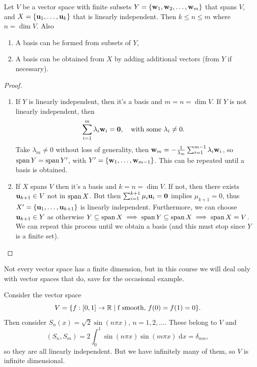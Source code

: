 \documentclass[a4paper]{scrartcl}
\begin{document}
\begin{proposition}
    Let $V$ be a vector space with finite subsets $Y = \{\mathbf{w}_1, \mathbf{w}_2, \dots, \mathbf{w}_m\}$ that spans $V$, and $X = \{\mathbf{u}_1, \dots, \mathbf{u}_k \}$ that is linearly independent. Then $k \leq n \leq m$ where $n = \operatorname{dim} V$. Also
    \begin{enumerate}[label=(\roman*)]
        \item A basis can be formed from subsets of $Y$,
        \item A basis can be obtained from $X$ by adding additional vectors (from $Y$ if necessary).
    \end{enumerate}
\end{proposition}
\begin{proof}
    \begin{enumerate}[label=(\roman*)]
        \item If $Y$ is linearly independent, then it's a basis and $m = n = \operatorname{dim} V$. If $Y$ is not linearly independent, then
        $$
        \sum_{i = 1}^m \lambda_i \mathbf{w}_i = \mathbf{0}, \quad \text{with some } \lambda_i \neq 0.
        $$
        Take $\lambda_m \neq 0$ without loss of generality, then $\mathbf{w}_m = -\frac{1}{\lambda_m} \sum_{i = 1}^{m - 1} \lambda_i \mathbf{w}_i$,
        so $\operatorname{span} Y = \operatorname{span} Y'$, with $Y' = \{\mathbf{w}_1, \dots, \mathbf{w}_{m - 1}\}$. This can be repeated until a basis is obtained.
        \item If $X$ spans $V$ then it's a basis and $k = n = \operatorname{dim} V$. If not, then there exists $\mathbf{u}_{k + 1} \in V$ not in $\operatorname{span} X$. But then $\sum_{i = 1}^{k + 1} \mu_i \mathbf{u}_i = \mathbf{0}$ implies $\mu_{k + 1} = 0$, thus $X' = \{\mathbf{u}_1, \dots, \mathbf{u}_{k + 1} \}$ is linearly independent. Furthermore, we can choose $\mathbf{u}_{k + 1} \in Y$ as otherwise $Y \subseteq \operatorname{span} X \implies \operatorname{span} Y \subseteq \operatorname{span} X \implies \operatorname{span} X = V$.
        We can repeat this process until we obtain a basis (and this must stop since $Y$ is a finite set).   \qedhere
    \end{enumerate}
\end{proof}

Not every vector space has a finite dimension, but in this course we will deal only with vector spaces that do, save for the occasional example.

\begin{example}
    Consider the vector space
    $$
    V = \{ f : [0, 1] \rightarrow \mathbb{R} \mid \text{f smooth, } f(0) = f(1) = 0 \}. 
    $$
    Then consider $S_n(x) = \sqrt{2} \sin(n \pi x)$, $n = 1, 2, \dots$. These belong to $V$ and
    $$
    (S_n, S_m) = 2 \int_{0}^1 \sin (n \pi x) \sin (m \pi x) \; \mathrm{d}x = \delta_{mn},
    $$
    so they are all linearly independent. But we have infinitely many of them, so $V$ is infinite dimensional.
\end{example}
\end{document}
